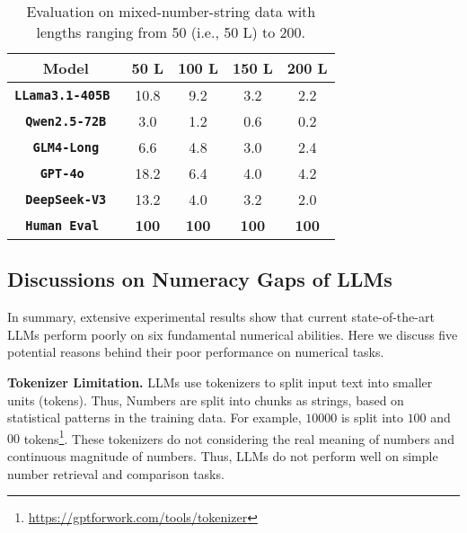 \begin{table}[]
	\centering
	\small
	\caption{Evaluation on mixed-number-string data with lengths ranging from 50 (i.e., 50 L) to 200.}
	
	\begin{tabular}{c|cccc}
		\toprule
		\textbf{Model}    & \textbf{50 L} & \textbf{100 L} & \textbf{150 L} & \textbf{200 L} \\ \midrule
		
		
		\textbf{\texttt{LLama3.1-405B }}& 10.8      & 9.2        & 3.2        & 2.2        \\  
		
		\textbf{\texttt{Qwen2.5-72B}}   & 3.0         & 1.2        & 0.6        & 0.2        \\  
		
		\textbf{\texttt{GLM4-Long}  }   & 6.6       & 4.8        & 3.0          & 2.4        \\  
		
		\textbf{\texttt{GPT-4o }}       & 18.2      & 6.4        & 4.0          & 4.2        \\ 
		
		\textbf{\texttt{DeepSeek-V3}}   & 13.2      & 4.0          & 3.2        & 2.0          \\  
		\midrule
		\textbf{\texttt{Human Eval } }   & \textbf{100}      & \textbf{100}        & \textbf{100}         & \textbf{100}        \\ \bottomrule
	\end{tabular}
	\label{tab:number_counting}
\end{table}
\subsection{Discussions on Numeracy Gaps of LLMs}
In summary, extensive experimental results show that current state-of-the-art LLMs perform poorly on six fundamental numerical abilities.
Here we discuss five potential reasons behind their poor performance on numerical tasks.

\noindent \textbf{Tokenizer Limitation.}
LLMs use tokenizers to split input text into smaller units (tokens). Thus,
Numbers are split into chunks as strings, based on statistical patterns in the training data.
For example, $10000$ is split into $100$ and $00$ tokens\footnote{\url{https://gptforwork.com/tools/tokenizer}}.
These tokenizers do not considering  the real meaning of numbers and continuous magnitude of numbers.
Thus, LLMs do not perform well on simple number retrieval and comparison tasks.

